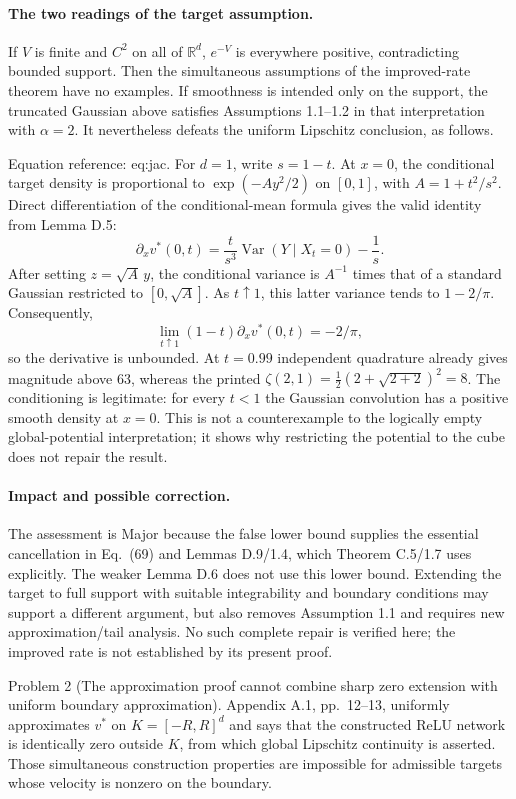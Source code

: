 \documentclass[10pt]{article}
\begin{document}
\paragraph*{The two readings of the target assumption.}\mbox{}\par
If \(V\) is finite and \(C^2\) on all of \(\mathbb R^d\), \(e^{-V}\) is everywhere positive, contradicting bounded support. Then the simultaneous assumptions of the improved-rate theorem have no examples. If smoothness is intended only on the support, the truncated Gaussian above satisfies Assumptions 1.1–1.2 in that interpretation with \(\alpha=2\). It nevertheless defeats the uniform Lipschitz conclusion, as follows.\par
Equation reference: eq:jac. For \(d=1\), write \(s=1-t\). At \(x=0\), the conditional target density is proportional to \(\exp(-Ay^2/2)\) on \([0,1]\), with \(A=1+t^2/s^2\). Direct differentiation of the conditional-mean formula gives the valid identity from Lemma D.5: \[
 \partial_xv^*(0,t)=\frac{t}{s^3}\operatorname{Var}(Y\mid X_t=0)-\frac1s.\] After setting \(z=\sqrt A\,y\), the conditional variance is \(A^{-1}\) times that of a standard Gaussian restricted to \([0,\sqrt A]\). As \(t\uparrow1\), this latter variance tends to \(1-2/\pi\). Consequently, \[\lim_{t\uparrow1}(1-t)\partial_xv^*(0,t)=-2/\pi,\] so the derivative is unbounded. At \(t=0.99\) independent quadrature already gives magnitude above 63, whereas the printed \(\zeta(2,1)=\frac12(2+\sqrt{2+2})^2=8\). The conditioning is legitimate: for every \(t<1\) the Gaussian convolution has a positive smooth density at \(x=0\). This is not a counterexample to the logically empty global-potential interpretation; it shows why restricting the potential to the cube does not repair the result.\par
\paragraph*{Impact and possible correction.}\mbox{}\par
The assessment is Major because the false lower bound supplies the essential cancellation in Eq. (69) and Lemmas D.9/1.4, which Theorem C.5/1.7 uses explicitly. The weaker Lemma D.6 does not use this lower bound. Extending the target to full support with suitable integrability and boundary conditions may support a different argument, but also removes Assumption 1.1 and requires new approximation/tail analysis. No such complete repair is verified here; the improved rate is not established by its present proof.\par
Problem 2 (The approximation proof cannot combine sharp zero extension with uniform boundary approximation).  Appendix A.1, pp. 12–13, uniformly approximates \(v^*\) on \(K=[-R,R]^d\) and says that the constructed ReLU network is identically zero outside \(K\), from which global Lipschitz continuity is asserted. Those simultaneous construction properties are impossible for admissible targets whose velocity is nonzero on the boundary.\par
\end{document}
